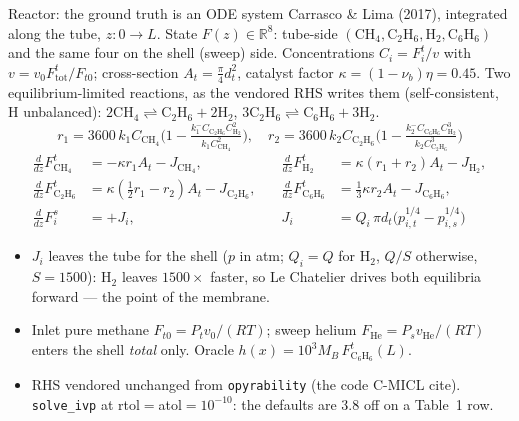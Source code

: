 \documentclass{beamer}
\begin{document}
\begin{frame}{Reactor: the ground truth is an ODE system}
  \small
  Carrasco \& Lima (2017), integrated along the tube, $z:0\to L$. State
  $F(z)\in\mathbb R^{8}$: tube-side $(\mathrm{CH_4},\mathrm{C_2H_6},\mathrm{H_2},
  \mathrm{C_6H_6})$ and the same four on the shell (sweep) side. Concentrations
  $C_i=F^t_i/v$ with $v=v_0F^t_{\text{tot}}/F_{t0}$; cross-section
  $A_t=\tfrac\pi4 d_t^2$, catalyst factor $\kappa=(1-\nu_b)\eta=0.45$. Two
  equilibrium-limited reactions, as the vendored RHS writes them (self-consistent,
  $\mathrm H$ unbalanced):
  $2\mathrm{CH_4}\rightleftharpoons\mathrm{C_2H_6}+2\mathrm{H_2}$,
  $3\mathrm{C_2H_6}\rightleftharpoons\mathrm{C_6H_6}+3\mathrm{H_2}$.
  \vspace{-0.4em}
  \[
    r_1 = 3600\,k_1C_{\mathrm{CH_4}}\Big(1-\tfrac{k_1^{-}C_{\mathrm{C_2H_6}}C_{\mathrm{H_2}}^{2}}
      {k_1C_{\mathrm{CH_4}}^{2}}\Big),
    \quad
    r_2 = 3600\,k_2C_{\mathrm{C_2H_6}}\Big(1-\tfrac{k_2^{-}C_{\mathrm{C_6H_6}}C_{\mathrm{H_2}}^{3}}
      {k_2C_{\mathrm{C_2H_6}}^{3}}\Big)
  \]
  \vspace{-0.6em}
  \[
    \begin{aligned}
      \tfrac{d}{dz}F^t_{\mathrm{CH_4}} &= -\kappa r_1A_t - J_{\mathrm{CH_4}}, &\quad
      \tfrac{d}{dz}F^t_{\mathrm{H_2}} &= \kappa(r_1+r_2)A_t - J_{\mathrm{H_2}}, \\[0.15em]
      \tfrac{d}{dz}F^t_{\mathrm{C_2H_6}} &= \kappa(\tfrac12 r_1-r_2)A_t - J_{\mathrm{C_2H_6}}, &\quad
      \tfrac{d}{dz}F^t_{\mathrm{C_6H_6}} &= \tfrac13\kappa r_2A_t - J_{\mathrm{C_6H_6}}, \\[0.15em]
      \tfrac{d}{dz}F^s_i &= +J_i, &\quad
      J_i &= Q_i\,\pi d_t\big(p_{i,t}^{1/4}-p_{i,s}^{1/4}\big)
    \end{aligned}
  \]
  \vspace{-0.7em}
  \begin{itemize}\footnotesize
    \item $J_i$ leaves the tube for the shell ($p$ in atm; $Q_i=Q$ for
      $\mathrm{H_2}$, $Q/S$ otherwise, $S=1500$): $\mathrm{H_2}$ leaves
      $1500\times$ faster, so Le Chatelier drives both equilibria forward --- the
      point of the membrane.
    \item Inlet pure methane $F_{t0}=P_tv_0/(RT)$; sweep helium
      $F_{\mathrm{He}}=P_sv_{\mathrm{He}}/(RT)$ enters the shell \emph{total}
      only. Oracle $h(x)=10^{3}M_B\,F^t_{\mathrm{C_6H_6}}(L)$.
    \item RHS vendored unchanged from \texttt{opyrability} (the code C-MICL cite).
      \texttt{solve\_ivp} at rtol$=$atol$=10^{-10}$: the defaults are $3.8$ off on
      a Table~1 row.
  \end{itemize}
\end{frame}
\end{document}
